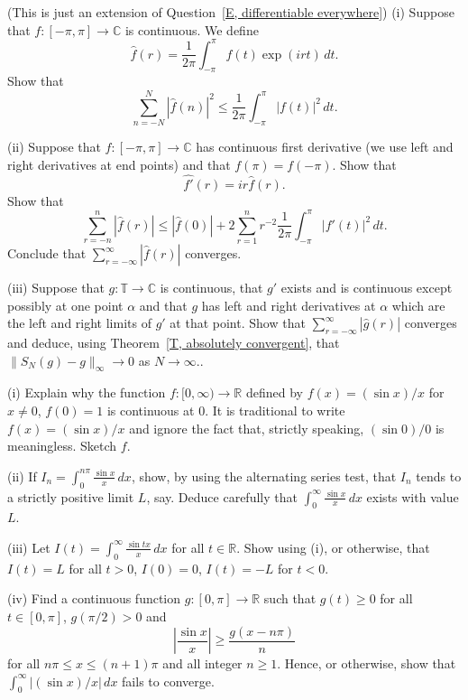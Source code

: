 \begin{question}\label{E, Kahane nice}
(This is just an extension of Question~\ref{E, differentiable everywhere})
(i) Suppose that  $f:[-\pi,\pi]\rightarrow{\mathbb C}$
is continuous. We define
\[\hat{f}(r)=\frac{1}{2\pi}\int_{-\pi}^{\pi}f(t)\exp(irt)\,dt.\]
Show that
\[\sum_{n=-N}^{N}|\hat{f}(n)|^{2}\leq
\frac{1}{2\pi}\int_{-\pi}^{\pi}|f(t)|^{2}\,dt.\]

(ii) Suppose that  $f:[-\pi,\pi]\rightarrow{\mathbb C}$
has continuous first derivative (we use left and right
derivatives at end points) and that $f(\pi)=f(-\pi)$. Show that
\[\widehat{f'}(r)=ir\hat{f}(r).\]
Show that
\[\sum_{r=-n}^{n}|\hat{f}(r)|\leq |\hat{f}(0)|
+2\sum_{r=1}^{n}r^{-2}\frac{1}{2\pi}\int_{-\pi}^{\pi}|f'(t)|^{2}\,dt.\]
Conclude that $\sum_{r=-\infty}^{\infty}|\hat{f}(r)|$ converges.

(iii) Suppose that  $g:{\mathbb T}\rightarrow{\mathbb C}$
is continuous, that $g'$ exists and is continuous
except possibly at one point $\alpha$ and that
$g$ has left and right derivatives at $\alpha$ which
are the left and right limits of $g'$ at that point.
Show that $\sum_{r=-\infty}^{\infty}|\hat{g}(r)|$ converges
and deduce, using Theorem~\ref{T, absolutely convergent}, that
$\|S_{N}(g)-g\|_{\infty}\rightarrow 0$ as $N\rightarrow\infty$..
\end{question}
\begin{question}\label{Q, infinite Dirichlet 1}
(i) Explain why the function $f:[0,\infty)\rightarrow{\mathbb R}$
defined by $f(x)=(\sin x)/x$ for $x\neq 0$, $f(0)=1$ is continuous
at $0$. It is traditional to write $f(x)=(\sin x)/x$
and ignore the fact that, strictly speaking, $(\sin 0)/0$
is meaningless. Sketch $f$.

(ii) If ${\displaystyle I_{n}=\int_{0}^{n\pi}\frac{\sin x}{x}\,dx}$,
show, by using the alternating series test, that $I_{n}$
tends to a strictly positive limit $L$, say. Deduce carefully
that ${\displaystyle \int_{0}^{\infty}\frac{\sin x}{x}\,dx}$
exists with value $L$.

(iii) Let ${\displaystyle
I(t)=\int_{0}^{\infty}\frac{\sin tx}{x}\,dx}$ for all $t\in{\mathbb R}$.
Show using (i), or otherwise, that
$I(t)=L$ for all $t>0$, $I(0)=0$, $I(t)=-L$ for $t<0$.

(iv) Find a  continuous function $g:[0,\pi]\rightarrow{\mathbb R}$
such that $g(t)\geq 0$ for all $t\in[0,\pi]$, $g(\pi/2)>0$
and
\[\left|\frac{\sin x}{x}\right|\geq \frac{g(x-n\pi)}{n}\]
for all $n\pi\leq x\leq(n+1)\pi$ and all integer $n\geq 1$.
Hence, or otherwise, show that $\int_{0}^{\infty}|(\sin x)/x|\,dx$
fails to converge.
\end{question}
